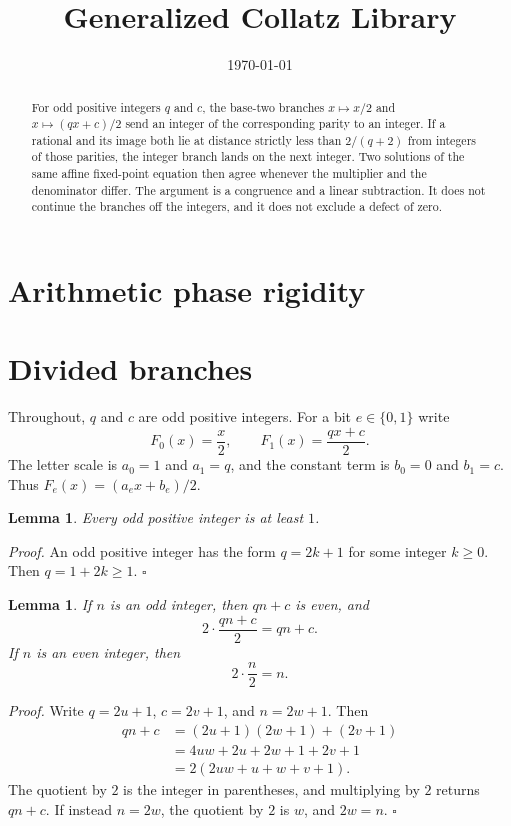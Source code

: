 \documentclass[11pt,letterpaper]{article}
\title{Generalized Collatz Library}
\author{}
\date{\today}
\newtheorem{lemma}[theorem]{Lemma}
\newenvironment{proof}{\noindent\textit{Proof.}}{\hfill\(\square\)}
\begin{document}
\maketitle
\section*{Arithmetic phase rigidity}

\begin{abstract}
For odd positive integers \(q\) and \(c\), the base-two branches \(x\mapsto x/2\) and \(x\mapsto(qx+c)/2\) send an integer of the corresponding parity to an integer. If a rational and its image both lie at distance strictly less than \(2/(q+2)\) from integers of those parities, the integer branch lands on the next integer. Two solutions of the same affine fixed-point equation then agree whenever the multiplier and the denominator differ. The argument is a congruence and a linear subtraction. It does not continue the branches off the integers, and it does not exclude a defect of zero.
\end{abstract}

\section{Divided branches}

Throughout, \(q\) and \(c\) are odd positive integers. For a bit \(e\in\{0,1\}\) write
\[
F_0(x)=\frac{x}{2},\qquad F_1(x)=\frac{qx+c}{2}.
\]
The letter scale is \(a_0=1\) and \(a_1=q\), and the constant term is \(b_0=0\) and \(b_1=c\). Thus \(F_e(x)=(a_e x+b_e)/2\).

\begin{lemma}
\label{lem:odd-one}
Every odd positive integer is at least \(1\).
\end{lemma}

\begin{proof}
An odd positive integer has the form \(q=2k+1\) for some integer \(k\geq 0\). Then \(q=1+2k\geq 1\).
\end{proof}

\begin{lemma}
\label{lem:numerator}
If \(n\) is an odd integer, then \(qn+c\) is even, and
\[
2\cdot\frac{qn+c}{2}=qn+c.
\]
If \(n\) is an even integer, then
\[
2\cdot\frac{n}{2}=n.
\]
\end{lemma}

\begin{proof}
Write \(q=2u+1\), \(c=2v+1\), and \(n=2w+1\). Then
\begin{align*}
qn+c
&=(2u+1)(2w+1)+(2v+1)\\
&=4uw+2u+2w+1+2v+1\\
&=2(2uw+u+w+v+1).
\end{align*}
The quotient by \(2\) is the integer in parentheses, and multiplying by \(2\) returns \(qn+c\). If instead \(n=2w\), the quotient by \(2\) is \(w\), and \(2w=n\).
\end{proof}
\end{document}
